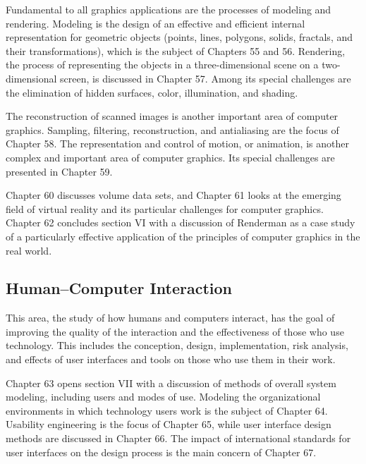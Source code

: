 Fundamental to all graphics applications are the processes of
modeling and rendering. Modeling is the design of an effective
and efficient internal representation for geometric objects
(points, lines, polygons, solids, fractals, and their
transformations), which is the subject of Chapters 55 and 56.
Rendering, the process of representing the objects in a
three-dimensional scene on a two-dimensional screen, is
discussed in Chapter 57. Among its special challenges are the
elimination of hidden surfaces, color, illumination, and shading.

The reconstruction of scanned images is another important area
of computer graphics. Sampling, filtering, reconstruction, and
antialiasing are the focus of Chapter 58. The representation
and control of motion, or animation, is another complex and
important area of computer graphics. Its special challenges are
presented in Chapter 59.

Chapter 60 discusses volume data sets, and Chapter 61 looks at
the emerging field of virtual reality and its particular
challenges for computer graphics. Chapter 62 concludes section VI
with a discussion of Renderman as a case study of a particularly
effective application of the principles of computer graphics in
the real world.

\enlargethispage{-1pc}
\subsection{Human--Computer Interaction}

This area, the study of how humans and computers interact, has
the goal of improving the quality of the interaction and the
effectiveness of those who use technology. This includes the
conception, design, implementation, risk analysis, and effects
of user interfaces and tools on those who use them in their work.

Chapter 63 opens section VII with a discussion of methods of
overall system modeling, including users and modes of use.
Modeling the organizational environments in which technology
users work is the subject of Chapter 64. Usability engineering
is the focus of Chapter 65, while user interface design methods
are discussed in Chapter 66. The impact of international
standards for user interfaces on the design process is the main
concern of Chapter 67.

